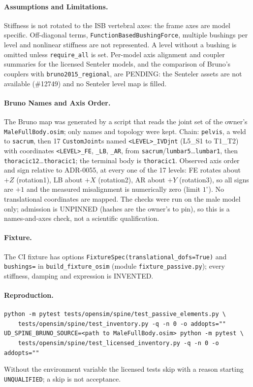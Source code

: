 \paragraph{Assumptions and Limitations.} Stiffness is not rotated to the ISB
vertebral axes: the frame axes are model specific. Off-diagonal terms,
\texttt{FunctionBasedBushingForce}, multiple bushings per level and
nonlinear stiffness are not represented. A level without a bushing is omitted
unless \texttt{require\_all} is set. Per-model axis alignment and coupler
summaries for the licensed Senteler models, and the comparison of Bruno's
couplers with \texttt{bruno2015\_regional}, are PENDING: the Senteler assets
are not available (\#12749) and no Senteler level map is filled.

\paragraph{Bruno Names and Axis Order.} The Bruno map was generated by a
script that reads the joint set of the owner's \texttt{MaleFullBody.osim}; only
names and topology were kept. Chain: \texttt{pelvis}, a weld to
\texttt{sacrum}, then 17 \texttt{CustomJoint}s named
\texttt{<LEVEL>\_IVDjnt} (L5\_S1 to T1\_T2) with coordinates
\texttt{<LEVEL>\_FE}, \texttt{\_LB}, \texttt{\_AR}, from
\texttt{sacrum}/\texttt{lumbar5}\ldots\texttt{lumbar1}, then
\texttt{thoracic12}\ldots\texttt{thoracic1}; the terminal body is
\texttt{thoracic1}. Observed axis order and sign relative to ADR-0055, at
every one of the 17 levels: FE rotates about $+Z$ (rotation1), LB about $+X$
(rotation2), AR about $+Y$ (rotation3), so all signs are $+1$ and the
measured misalignment is numerically zero (limit $1^\circ$).
No translational coordinates are mapped. The checks were run on the male
model only; admission is UNPINNED (hashes are the owner's to pin), so this is
a names-and-axes check, not a scientific qualification.

\paragraph{Fixture.} The CI fixture has options
\texttt{FixtureSpec(translational\_dofs=True)} and \texttt{bushings=} in
\texttt{build\_fixture\_osim} (module \texttt{fixture\_passive.py}); every
stiffness, damping and expression is INVENTED.

\paragraph{Reproduction.}
\begin{verbatim}
python -m pytest tests/opensim/spine/test_passive_elements.py \
    tests/opensim/spine/test_inventory.py -q -n 0 -o addopts=""
UD_SPINE_BRUNO_SOURCE=<path to MaleFullBody.osim> python -m pytest \
    tests/opensim/spine/test_licensed_inventory.py -q -n 0 -o addopts=""
\end{verbatim}
Without the environment variable the licensed tests skip with a reason
starting \texttt{UNQUALIFIED}; a skip is not acceptance.
